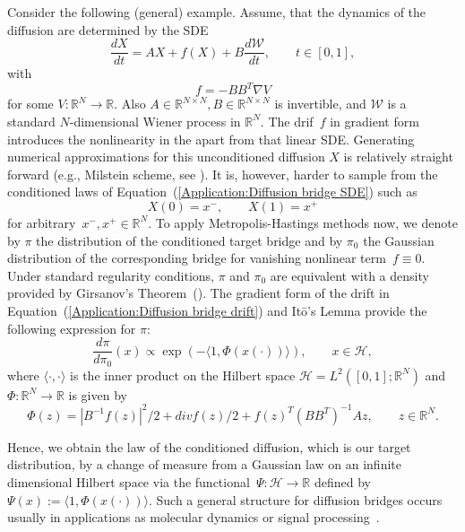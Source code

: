 Consider the following (general) example. Assume, that the dynamics of the diffusion are determined by the SDE
\begin{equation}
 \label{Application:Diffusion bridge SDE}
 \frac{dX}{dt} = AX + f(X) + B \frac{d\mathcal{W}}{dt}, \qquad t \in [0,1],
\end{equation}
with
\begin{equation}
 \label{Application:Diffusion bridge drift}
 f = - B B^T \nabla V
\end{equation}
for some $V: \mathbb{R}^N \to \mathbb{R}$. Also $A \in \mathbb{R}^{N \times N}, B \in \mathbb{R}^{N \times N}$ is invertible, and $\mathcal{W}$ is a standard $N$-dimensional Wiener process in $\mathbb{R}^N$. The drif~$f$ in gradient form introduces the nonlinearity in the apart from that linear SDE. Generating numerical approximations for this unconditioned diffusion $X$ is relatively straight forward (e.g., Milstein scheme, see \autocite{Kloeden1992}). It is, however, harder to sample from the conditioned laws of Equation~(\ref{Application:Diffusion bridge SDE}) such as 
\begin{equation}
 X(0) = x^-, \qquad X(1) = x^+
\end{equation}
for arbitrary~$x^-, x^+ \in \mathbb{R}^N$. To apply Metropolis-Hastings methods now, we denote by $\pi$ the distribution of the conditioned target bridge and by $\pi_0$ the Gaussian distribution of the corresponding bridge for vanishing nonlinear term~$f \equiv 0$. Under standard regularity conditions, $\pi$ and $\pi_0$ are equivalent with a density provided by Girsanov's Theorem~(\autocite{Oksendal2003}). The gradient form of the drift in Equation~(\ref{Application:Diffusion bridge drift}) and It\={o}'s Lemma provide the following expression for $\pi$:
\begin{equation}
 \frac{d\pi}{d\pi_0} (x) \varpropto \exp (- \langle 1, \Phi (x(\cdot)) \rangle ), \qquad x \in \mathcal{H},
\end{equation}
where $\langle \cdot, \cdot \rangle$ is the inner product on the Hilbert space $\mathcal{H} = L^2 ([0,1]; \mathbb{R}^N)$ and $\Phi: \mathbb{R}^N \to \mathbb{R}$ is given by 
\begin{equation}
 \Phi(z) = |B^{-1}f(z)|^2 /2 + div f(z) /2 + f(z)^T ( B B^T)^{-1} Az, \qquad z \in \mathbb{R}^N.
\end{equation}

Hence, we obtain the law of the conditioned diffusion, which is our target distribution, by a change of measure from a Gaussian law on an infinite dimensional Hilbert space via the functional~$\Psi: \mathcal{H} \to \mathbb{R}$ defined by $\Psi (x) := \langle 1, \Phi(x(\cdot)) \rangle $. Such a general structure for diffusion bridges occurs usually in applications as molecular dynamics or signal processing~\autocite{Beskos2008, Beskos2009, Hairer2011}.


